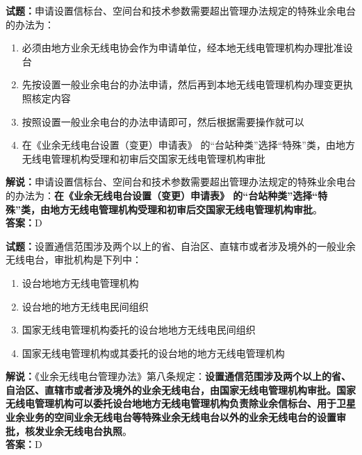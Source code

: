 \documentclass{ctexbook}
\begin{document}
\noindent\textbf{试题：}申请设置信标台、空间台和技术参数需要超出管理办法规定的特殊业余电台的办法为：
\begin{enumerate}[leftmargin=3em]
\item 必须由地方业余无线电协会作为申请单位，经本地无线电管理机构办理批准设台
\item 先按设置一般业余电台的办法申请，然后再到本地无线电管理机构办理变更执照核定内容
\item 按照设置一般业余电台的办法申请即可，然后根据需要操作就可以
\item 在《业余无线电台设置（变更）申请表》 的“台站种类”选择“特殊”类，由地方无线电管理机构受理和初审后交国家无线电管理机构审批
\end{enumerate}
\noindent\textbf{解说：}申请设置信标台、空间台和技术参数需要超出管理办法规定的特殊业余电台的办法为：\textbf{在《业余无线电台设置（变更）申请表》 的“台站种类”选择“特殊”类，由地方无线电管理机构受理和初审后交国家无线电管理机构审批}。\\\noindent\textbf{答案：}D

\bigskip




\noindent\textbf{试题：}设置通信范围涉及两个以上的省、自治区、直辖市或者涉及境外的一般业余无线电台，审批机构是下列中：
\begin{enumerate}[leftmargin=3em]
\item 设台地地方无线电管理机构
\item 设台地的地方无线电民间组织
\item 国家无线电管理机构委托的设台地地方无线电民间组织
\item 国家无线电管理机构或其委托的设台地的地方无线电管理机构
\end{enumerate}
\noindent\textbf{解说：}《业余无线电台管理办法》第八条规定：\textbf{设置通信范围涉及两个以上的省、自治区、直辖市或者涉及境外的业余无线电台，由国家无线电管理机构审批。国家无线电管理机构可以委托设台地地方无线电管理机构负责除业余信标台、用于卫星业余业务的空间业余无线电台等特殊业余无线电台以外的业余无线电台的设置审批，核发业余无线电台执照}。\\\noindent\textbf{答案：}D

\bigskip
\end{document}
